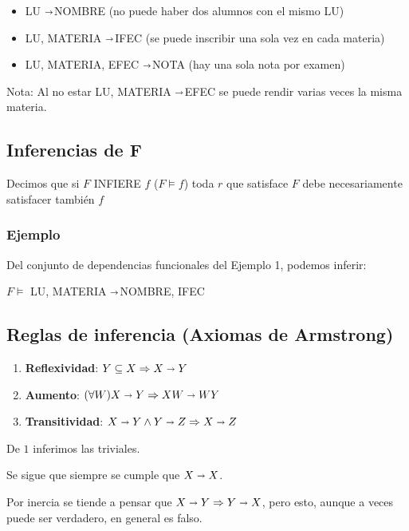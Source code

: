 \documentclass[10pt, a4paper,english,spanish]{article}
\newcommand{\imp}{\shortrightarrow}
\newcommand{\imps}{$\shortrightarrow$}
\begin{document}
\begin{itemize}
    \item LU \imps NOMBRE (no puede haber dos alumnos con el mismo LU)
    \item LU, MATERIA \imps IFEC (se puede inscribir una sola vez en cada materia)
    \item LU, MATERIA, EFEC \imps NOTA (hay una sola nota por examen)
\end{itemize}

Nota: Al no estar LU, MATERIA \imps EFEC se puede rendir varias veces la misma materia.

\subsection{Inferencias de F}


Decimos que si $F$ INFIERE $f$ ($F \vDash f$) toda $r$ que satisface $F$ debe necesariamente satisfacer también $f$

\subsubsection{Ejemplo}
Del conjunto de dependencias funcionales del Ejemplo 1, podemos inferir:

$F \vDash$ LU, MATERIA \imps NOMBRE, IFEC

\subsection{Reglas de inferencia (Axiomas de Armstrong)}
\begin{enumerate}
    \item \textbf{Reflexividad}: $Y \subseteq X \Rightarrow X \imp Y$
    \item \textbf{Aumento}: $(\forall W) X \imp Y \Rightarrow XW \imp WY$
    \item \textbf{Transitividad}: $X \imp Y \land Y \imp Z \Rightarrow X \imp Z$
\end{enumerate}

De $1$ inferimos las triviales.

Se sigue que siempre se cumple que $X \imp X$.

Por inercia se tiende a pensar que $X \imp Y \Rightarrow Y \imp X$, pero esto, aunque a veces puede ser verdadero, en general es falso.
\end{document}
